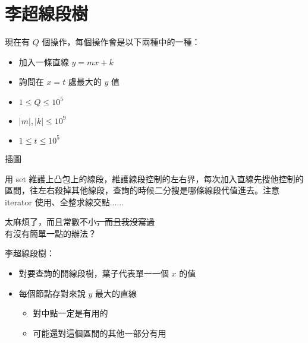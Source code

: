 \section{李超線段樹}

\begin{frame}{\ebtitle}
    \begin{problem}[動態凸包]
        現在有 $Q$ 個操作，每個操作會是以下兩種中的一種：

        \begin{itemize}
            \item 加入一條直線 $y = mx + k$
            \item 詢問在 $x = t$ 處最大的 $y$ 值
        \end{itemize}

        \begin{itemize}
            \item $1\le Q \le 10^5$
            \item $|m|, |k| \le 10^9$
            \item $1 \le t \le 10^5$
        \end{itemize}
    \end{problem}
\end{frame}

\begin{frame}{\ebtitle}
    \todo 插圖
\end{frame}

\begin{frame}{\ebtitle}
    用 set 維護上凸包上的線段，維護線段控制的左右界，每次加入直線先搜他控制的區間，往左右殺掉其他線段，查詢的時候二分搜是哪條線段代值進去。注意 iterator 使用、全整求線交點......

    太麻煩了，而且常數不小\sout{，而且我沒寫過} \\
    有沒有簡單一點的辦法？
\end{frame}

\begin{frame}{\ebtitle}
    李超線段樹：
    \begin{itemize}
        \item 對要查詢的開線段樹，葉子代表單一一個 $x$ 的值
        \item 每個節點存對來說 $y$ 最大的直線
        \begin{itemize}
            \item 對中點一定是有用的
            \item 可能還對這個區間的其他一部分有用
        \end{itemize}
    \end{itemize}
\end{frame}

